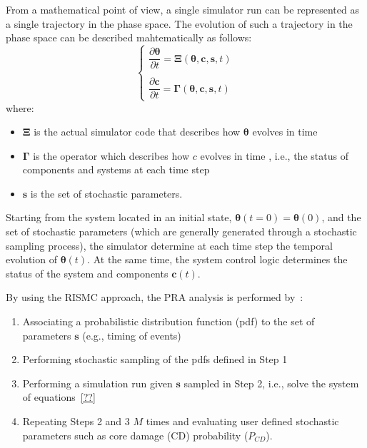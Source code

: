 From a mathematical point of view, a single simulator run can be represented as a single trajectory in the 
phase space. The evolution of such a trajectory in the phase space can be described mahtematically as follows:
\begin{equation}
  \begin{cases}
    \dfrac{\partial \boldsymbol \theta }{\partial t}  = \boldsymbol \Xi (\boldsymbol \theta , \boldsymbol c, \boldsymbol s , t)   \\ \\ 
    \dfrac{\partial \boldsymbol c }{\partial t}  = \boldsymbol \Gamma (\boldsymbol \theta , \boldsymbol c, \boldsymbol s , t) 
  \end{cases}    
  \label{eq:trajectory}
\end{equation}
where:
\begin{itemize}
  \item $\boldsymbol \Xi$ is the actual simulator code that describes how $\boldsymbol \theta$ evolves in time
  \item $\boldsymbol \Gamma$ is the operator which describes how $c$ evolves in time , i.e., the status 
        of components and systems at each time step
  \item $\boldsymbol s$ is the set of stochastic parameters. 
\end{itemize}

Starting from the system located in an initial state, $\boldsymbol \theta (t=0) = \boldsymbol \theta(0)$, 
and the set of stochastic parameters (which are generally generated through a stochastic sampling process), 
the simulator determine at each 
time step the temporal evolution of $\boldsymbol \theta (t)$. At the same time, the system control logic  
determines the status of the system and components $\boldsymbol c(t)$.
 
By using the RISMC approach, the PRA analysis is performed by~\cite{}:
\begin{enumerate}
  \item Associating a probabilistic distribution function (pdf) to the set of parameters 
        $\boldsymbol s$ (e.g., timing of events)
  \item Performing stochastic sampling of the pdfs defined in Step 1
  \item Performing a simulation run given $\boldsymbol s$ sampled in Step 2, i.e., solve the 
        system of equations~\ref{??}
  \item Repeating Steps 2 and 3 $M$ times and evaluating user defined stochastic parameters such 
        as core damage (CD) probability ($P_{CD}$).
\end{enumerate}

